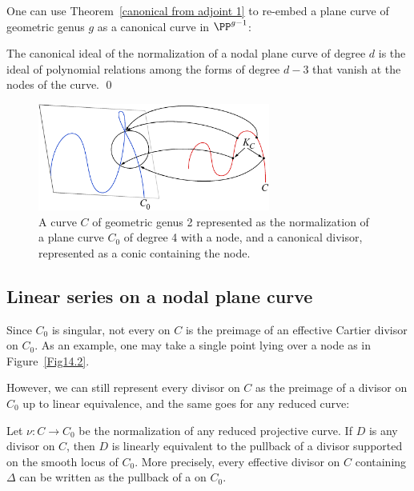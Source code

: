 One can use Theorem~\ref{canonical from adjoint 1} to re-embed a plane
curve of
geometric genus $g$ as a 
canonical curve 
%
in $\PP^{g-1}$:

\begin{corollary}
 The canonical ideal of the normalization of a nodal plane curve of
 degree $d$ is the ideal of polynomial relations
 among the forms of degree $d-3$ that vanish at the nodes of the
 curve. \qed
\end{corollary}

\begin{figure}
\centerline {\includegraphics[width=3in]{"main/Fig14-2"}}
\caption{A curve $C$ of geometric genus 2 represented as the normalization
of a plane curve $C_{0}$ of degree 4 with a node, and a canonical divisor,
represented as a conic containing the node.}
\label{canonical on normalization}
\end{figure}

\subsection{Linear series on a nodal plane curve}
\label{linear series on nodal plane curves}

Since $C_{0}$ is singular, not every 
%
on $C$ is the
preimage of an
effective Cartier divisor on $C_{0}$. As an example, one may take a
single point lying over a node
as in Figure~\ref{Fig14.2}.

However,
we can still represent every divisor on $C$ as the preimage of a divisor
on $C_{0}$ up to linear
equivalence, and the same goes for any reduced curve:

\begin{lemma}
Let $\nu: C\to C_{0}$ be the normalization of any reduced projective
%
curve. If $D$ is any divisor
on $C$, then $D$ is linearly equivalent to the pullback of a divisor
supported on the smooth locus of  $C_{0}$. More precisely,  every
effective divisor on $C$ containing $\Delta$ can be written as the
pullback
of a 
%
on $C_{0}$.
\unif
\end{lemma}

